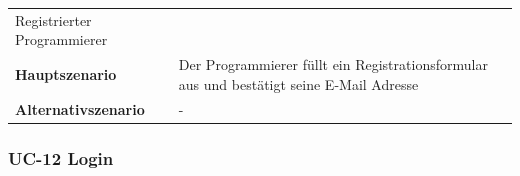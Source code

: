 \begin{longtable}[c]{@{}ll@{}}
\begin{minipage}[t]{0.60\columnwidth}
Registrierter Programmierer
\strut\end{minipage}\tabularnewline
\begin{minipage}[t]{0.34\columnwidth}\raggedright\strut
\textbf{Hauptszenario}
\strut\end{minipage} &
\begin{minipage}[t]{0.60\columnwidth}\raggedright\strut
Der Programmierer füllt ein Registrationsformular aus und bestätigt
seine E-Mail Adresse
\strut\end{minipage}\tabularnewline
\begin{minipage}[t]{0.34\columnwidth}\raggedright\strut
\textbf{Alternativszenario}
\strut\end{minipage} &
\begin{minipage}[t]{0.60\columnwidth}\raggedright\strut
-
\strut\end{minipage}\tabularnewline
\bottomrule
\end{longtable}

\subsubsection{UC-12 Login}\label{uc-12-login}

